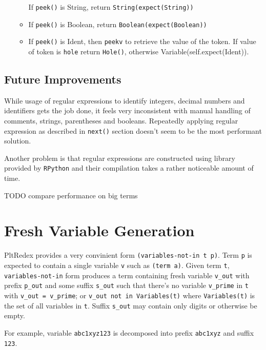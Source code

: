 \begin{itemize}
\begin{itemize}
		If \texttt{peek()} is String, return \texttt{String(expect(String))}
	\item
		If \texttt{peek()} is Boolean, return \texttt{Boolean(expect(Boolean))}
	\item

		If \texttt{peek()} is Ident, then \texttt{peekv} to retrieve the value of the token. If value of token is \texttt{hole} return \texttt{Hole()}, otherwise Variable(self.expect(Ident)).
	\end{itemize}
	

\end{itemize}


\subsection{Future Improvements}
While usage of regular expressions to identify integers, decimal numbers and identifiers gets the job done, it feels very inconsistent with manual handling of comments, strings, parentheses and booleans. Repeatedly applying regular expression as described in \texttt{next()} section doesn't seem to be the most performant solution.

Another problem is that regular expressions are constructed using library provided by \texttt{RPython} and their compilation takes a rather noticeable amount of time. 

TODO compare performance on big terms


\section{Fresh Variable Generation}
PltRedex provides a very convinient form \texttt{(variables-not-in t p)}. Term \texttt{p} is expected to contain a single variable \texttt{v} such as \texttt{(term a)}. Given term \texttt{t}, \texttt{variables-not-in} form produces a term containing fresh variable \texttt{v\_out} with prefix \texttt{p\_out} and some suffix \texttt{s\_out} such that there's no variable \texttt{v\_prime} in \texttt{t} with \texttt{v\_out = v\_prime}; or \texttt{v\_out not in Variables(t)} where \texttt{Variables(t)} is the set of all variables in \texttt{t}. Suffix \texttt{s\_out} may contain only digits or otherwise be empty. 

For example, variable \texttt{abc1xyz123} is decomposed into prefix \texttt{abc1xyz} and suffix \texttt{123}.

